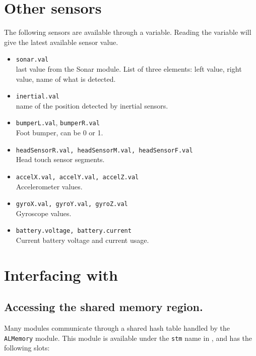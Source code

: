 \section{Other sensors}

The following sensors are available through a \us variable.
Reading the variable will give the latest available sensor value.

\begin{itemize}
\item \lstinline|sonar.val| \\
    last value from the Sonar module. List of three elements: left value, right
    value, name of what is detected.
\item \lstinline|inertial.val| \\
    name of the position detected by inertial sensors.
\item \lstinline|bumperL.val|, \lstinline|bumperR.val| \\
    Foot bumper, can be 0 or 1.
\item \lstinline|headSensorR.val, headSensorM.val, headSensorF.val| \\
    Head touch sensor segments.
\item \lstinline|accelX.val, accelY.val, accelZ.val| \\
    Accelerometer values.
\item \lstinline|gyroX.val, gyroY.val, gyroZ.val| \\
    Gyroscope values.
\item \lstinline|battery.voltage, battery.current| \\
    Current battery voltage and current usage.
\end{itemize}

\section{Interfacing with \naoqi}

\subsection{Accessing the \naoqi shared memory region.}

Many \naoqi modules communicate through a shared hash table handled by the
\lstinline|ALMemory| module. This module is available under the \lstinline|stm|
name in \urbi, and has the following slots:

